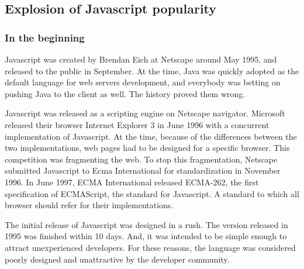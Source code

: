 \subsection{Explosion of Javascript popularity}

\subsubsection{In the beginning}

Javascript was created by Brendan Eich at Netscape around May 1995, and released to the public in September.
At the time, Java was quickly adopted as the default language for web servers development, and everybody was betting on pushing Java to the client as well.
The history proved them wrong.

Javascript was released as a scripting engine on Netscape navigator.
Microsoft released their browser Internet Explorer 3 in June 1996 with a concurrent implementation of Javascript.
At the time, because of the differences between the two implementations, web pages had to be designed for a specific browser.
This competition was fragmenting the web.
To stop this fragmentation, Netscape submitted Javascript to Ecma International for standardization in November 1996.
In June 1997, ECMA International released ECMA-262, the first specification of ECMAScript, the standard for Javascript.
A standard to which all browser should refer for their implementations.

The initial release of Javascript was designed in a rush. The version released in 1995 was finished within 10 days.
And, it was intended to be simple enough to attract unexperienced developers.
For these reasons, the language was considered poorly designed and unattractive by the developer community.


